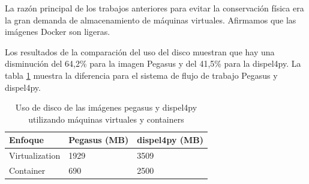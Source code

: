 La razón principal de los trabajos anteriores para evitar la conservación física era la gran demanda de almacenamiento de máquinas virtuales. Afirmamos que las imágenes Docker son ligeras. 

Los resultados de la comparación del uso del disco muestran que hay una disminución del 64,2\% para la imagen Pegasus y del 41,5\% para la dispel4py. La tabla \ref{storage-reduce} muestra la diferencia para el sistema de flujo de trabajo Pegasus y dispel4py.


\begin{table}[]
\centering
\begin{tabular}{|l|l|l|}
\hline
Enfoque        & Pegasus (MB) & dispel4py (MB) \\ \hline
Virtualization & 1929         & 3509 \\ \hline
Container      & 690          & 2500 \\ \hline
\end{tabular}
\caption{Uso de disco de las imágenes pegasus y dispel4py utilizando máquinas virtuales y containers}
\label{storage-reduce}
\end{table}